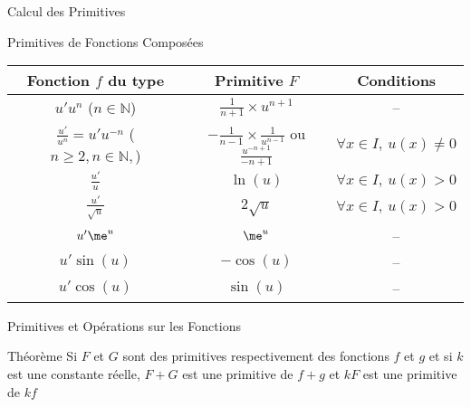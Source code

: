 \documentclass{cours}
\begin{document}
\begin{Gpartie}{Calcul des Primitives}
\begin{Spartie}{Primitives de Fonctions Composées}
            \begin{center}\begin{tabular}[c]{ |c|c|c| } \hline
                Fonction $f$ du type                                    & Primitive $F$                                                             & Conditions  \\ \hline\hline
                $u'u^n$ ($n\in\mathbb{N}$)                              & $\frac{1}{n+1}\times u^{n+1}$                                             & \---\\ \hline
                $\frac{u'}{u^n}=u'u^{-n}$ ($n\geq2, n\in\mathbb{N},$)   & $-\frac{1}{n-1}\times\frac{1}{u^{n-1}}$ ou $\frac{u^{-n+1}}{-n+1}$        & $\forall x\in I,\ u(x)\neq0$ \\ \hline
                $\frac{u'}{u}$                                          & $\ln(u)$                                                                  & $\forall x\in I,\ u(x)>0$ \\ \hline
                $\frac{u'}{\sqrt{u}}$                                   & $2\sqrt{u}$                                                               & $\forall x\in I,\ u(x)>0$ \\ \hline
                $u'\me^u$                                                 & $\me^u$                                                                     & \---\\ \hline
                $u'\sin(u)$                                             & $-\cos(u)$                                                                & \---\\ \hline
                $u'\cos(u)$                                             & $\sin(u)$                                                                 & \---\\ \hline
            \end{tabular}\end{center}
            \parbox{\linewidth}{}
        \end{Spartie}
        \pagebreak
        \begin{Spartie}{Primitives et Opérations sur les Fonctions} 
            \begin{SSpartie}{Théorème} 
                Si $F$ et $G$ sont des primitives respectivement des fonctions $f$ et $g$ et si $k$ est une constante réelle, $F+G$ est une primitive de $f+g$ et $kF$ est une primitive de $kf$
            \end{SSpartie}

\end{Spartie}
\end{Gpartie}
\end{document}
